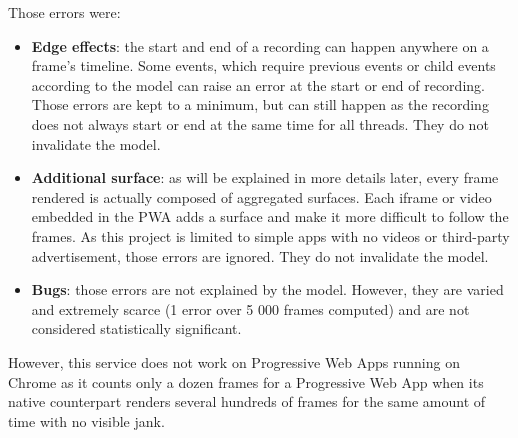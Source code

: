 \documentclass{kththesis}
\begin{document}
    Those errors were:
    \begin{itemize}
        \item \textbf{Edge effects}: the start and end of a recording can happen anywhere on a frame's timeline. Some events, which require previous events or child events according to the model can raise an error at the start or end of recording. Those errors are kept to a minimum, but can still happen as the recording does not always start or end at the same time for all threads. They do not invalidate the model.
        \item \textbf{Additional surface}: as will be explained in more details later, every frame rendered is actually composed of aggregated surfaces. Each iframe or video embedded in the PWA adds a surface and make it more difficult to follow the frames. As this project is limited to simple apps with no videos or third-party advertisement, those errors are ignored. They do not invalidate the model.
        \item \textbf{Bugs}: those errors are not explained by the model. However, they are varied and extremely scarce (1 error over 5 000 frames computed) and are not considered statistically significant.
    \end{itemize}
    

    
    \iffalse
    However, this service does not work on Progressive Web Apps running on Chrome as it counts only a dozen frames for a Progressive Web App when its native counterpart renders several hundreds of frames for the same amount of time with no visible jank. 
    
\end{document}
